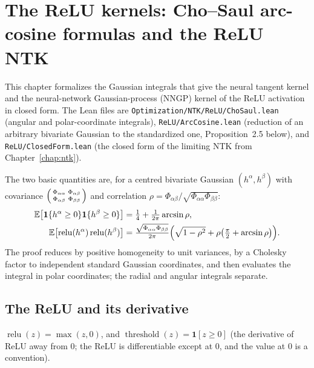 \chapter{The ReLU kernels: Cho--Saul arc-cosine formulas and the ReLU NTK}\label{chap:ntkr}

This chapter formalizes the Gaussian integrals that give the neural tangent kernel and the
neural-network Gaussian-process (NNGP) kernel of the ReLU activation in closed form.
The Lean files are \texttt{Optimization/NTK/ReLU/ChoSaul.lean} (angular and polar-coordinate
integrals), \texttt{ReLU/ArcCosine.lean} (reduction of an arbitrary bivariate Gaussian to the
standardized one, Proposition~2.5 below), and \texttt{ReLU/ClosedForm.lean} (the closed form of the
limiting NTK from Chapter~\ref{chap:ntk}).

The two basic quantities are, for a centred bivariate Gaussian $(h^\alpha,h^\beta)$ with covariance
$\begin{psmallmatrix}\Phi_{\alpha\alpha}&\Phi_{\alpha\beta}\\ \Phi_{\alpha\beta}&\Phi_{\beta\beta}\end{psmallmatrix}$
and correlation $\rho=\Phi_{\alpha\beta}/\sqrt{\Phi_{\alpha\alpha}\Phi_{\beta\beta}}$:
\begin{align*}
  \mathbb E\bigl[\mathbf 1\{h^\alpha\ge0\}\mathbf 1\{h^\beta\ge0\}\bigr]
  &=\tfrac14+\tfrac{1}{2\pi}\arcsin\rho,\\
  \mathbb E\bigl[\operatorname{relu}(h^\alpha)\operatorname{relu}(h^\beta)\bigr]
  &=\tfrac{\sqrt{\Phi_{\alpha\alpha}\Phi_{\beta\beta}}}{2\pi}\Bigl(\sqrt{1-\rho^2}+\rho\bigl(\tfrac\pi2+\arcsin\rho\bigr)\Bigr).
\end{align*}
The proof reduces by positive homogeneity to unit variances, by a Cholesky factor to independent
standard Gaussian coordinates, and then evaluates the integral in polar coordinates; the radial and
angular integrals separate.


\section{The ReLU and its derivative}\label{sec:ntkr:relu}

\begin{definition}\label{def:ntkr:relu}
  \leanok
$\operatorname{relu}(z)=\max(z,0)$, and $\operatorname{threshold}(z)=\mathbf 1[z\ge0]$ (the derivative of ReLU away from $0$; the ReLU is differentiable except at $0$, and the value
at $0$ is a convention).
\end{definition}

